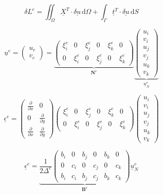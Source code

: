 \documentclass{article}
\begin{document}
\[
\delta L^e = \iint_\Omega \underline{X}^T \cdot \underline{\delta u}\, \mathrm{d}\Omega + \int_\Gamma \underline{t}^T \cdot \underline{\delta u}\, \mathrm{d}S
\]

\[
\underline{u}^e = 
\left( 
\begin{matrix}
u_e \\
v_e 
\end{matrix}
\right) 
= \underbrace{
\left( 
\begin{matrix}
\xi^e_i &       0 & \xi^e_j &       0 & \xi^e_k &       0 \\
      0 & \xi^e_i &       0 & \xi^e_j &       0 & \xi^e_k
\end{matrix}
\right)}_{\mathbf{N}^e}
\underbrace{\left( 
\begin{matrix}
u_i \\
v_i \\
u_j \\
v_j \\
u_k \\
v_k
\end{matrix}
\right)}_{\underline{u}^e_N}
\]

\[
\underline{\epsilon}^e = 
\left( 
\begin{matrix}
\frac{\partial}{\partial x} &                           0 \\
                          0 & \frac{\partial}{\partial y} \\
\frac{\partial}{\partial x} & \frac{\partial}{\partial y}
\end{matrix}
\right) 
\left( 
\begin{matrix}
\xi^e_i &       0 & \xi^e_j &       0 & \xi^e_k &       0 \\
      0 & \xi^e_i &       0 & \xi^e_j &       0 & \xi^e_k
\end{matrix}
\right)
\left( 
\begin{matrix}
u_i \\
v_i \\
u_j \\
v_j \\
u_k \\
v_k
\end{matrix}
\right)
\]

\[
\underline{\epsilon}^e = \underbrace{\frac{1}{2 \Delta^e}
\left( 
\begin{matrix}
b_i &   0 & b_j &   0 & b_k &   0 \\
  0 & c_i &   0 & c_j &   0 & c_k \\
b_i & c_i & b_j & c_j & b_k & c_k
\end{matrix}
\right)}_{\mathbf{B}^e}
\underline{u}^e_N
\]
\end{document}
